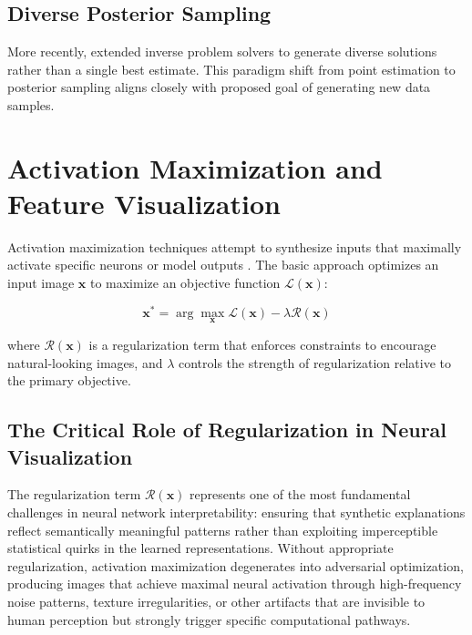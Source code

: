 \subsection{Diverse Posterior Sampling}

More recently, \citep{cohen2024posteriorsamplingmeaningfuldiversity} extended inverse problem solvers to generate diverse solutions rather than a single best estimate. This paradigm shift from point estimation to posterior sampling aligns closely with proposed goal of generating new data samples.

\section{Activation Maximization and Feature Visualization}

Activation maximization techniques attempt to synthesize inputs that maximally activate specific neurons or model outputs \citep{erhan2009visualizing, mordvintsev2015deepdream}. The basic approach optimizes an input image $\mathbf{x}$ to maximize an objective function $\mathcal{L}(\mathbf{x})$:

\begin{equation}
\mathbf{x}^* = \arg\max_{\mathbf{x}} \mathcal{L}(\mathbf{x}) - \lambda \mathcal{R}(\mathbf{x})
\label{eq:activation_maximization}
\end{equation}

where $\mathcal{R}(\mathbf{x})$ is a regularization term that enforces constraints to encourage natural-looking images, and $\lambda$ controls the strength of regularization relative to the primary objective.

\subsection{The Critical Role of Regularization in Neural Visualization}

The regularization term $\mathcal{R}(\mathbf{x})$ represents one of the most fundamental challenges in neural network interpretability: ensuring that synthetic explanations reflect semantically meaningful patterns rather than exploiting imperceptible statistical quirks in the learned representations. Without appropriate regularization, activation maximization degenerates into adversarial optimization, producing images that achieve maximal neural activation through high-frequency noise patterns, texture irregularities, or other artifacts that are invisible to human perception but strongly trigger specific computational pathways.

